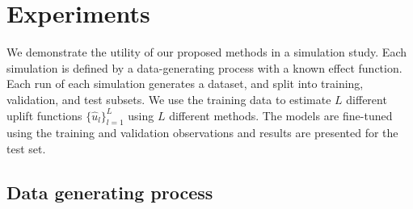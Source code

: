\documentclass{article}
\begin{document}
\section{Experiments}

We demonstrate the utility of our proposed methods in a simulation study. Each simulation is defined by a data-generating process with a known effect function. Each run of each simulation generates a dataset, and split into training, validation, and test subsets. We use the training data to estimate $L$ different uplift functions $\{\hat{u}_l\}_{l=1}^L$ using $L$ different methods. The models are fine-tuned using the training and validation observations and results are presented for the test set.

\subsection{Data generating process}
\end{document}
